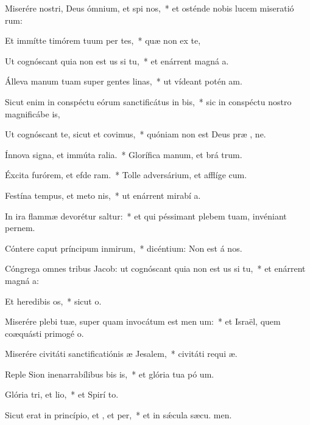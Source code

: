 \item Miserére nostri, Deus ómnium, et spi nos,~* et osténde nobis lucem miseratió rum:
\item Et immítte timórem tuum per tes,~* quæ non ex te,
\item Ut cognóscant quia non est us si tu,~* et enárrent magná a.
\item Álleva manum tuam super gentes linas,~* ut vídeant potén am.
\item Sicut enim in conspéctu eórum sanctificátus  in bis,~* sic in conspéctu nostro magnificábe  is,
\item Ut cognóscant te, sicut et  covimus,~* quóniam non est Deus præ , ne.
\item Ínnova signa, et immúta ralia.~* Glorífica manum, et brá trum.
\item Éxcita furórem, et efde ram.~* Tolle adversárium, et afflíge cum.
\item Festína tempus, et meto nis,~* ut enárrent mirabí a.
\item In ira flammæ devorétur  saltur:~* et qui péssimant plebem tuam, invéniant pernem.
\item Cóntere caput príncipum inmirum,~* dicéntium: Non est á  nos.
\item Cóngrega omnes tribus Jacob: ut cognóscant quia non est us si tu,~* et enárrent magná a:
\item Et heredibis os,~* sicut  o.
\item Miserére plebi tuæ, super quam invocátum est men um:~* et Israël, quem coæquásti primogé o.
\item Miserére civitáti sanctificatiónis æ Jesalem,~* civitáti requi æ.
\item Reple Sion inenarrabílibus bis is,~* et glória tua pó um.
\item Glória tri, et lio,~* et Spirí to.
\item Sicut erat in princípio, et , et per,~* et in sǽcula sæcu. men.
